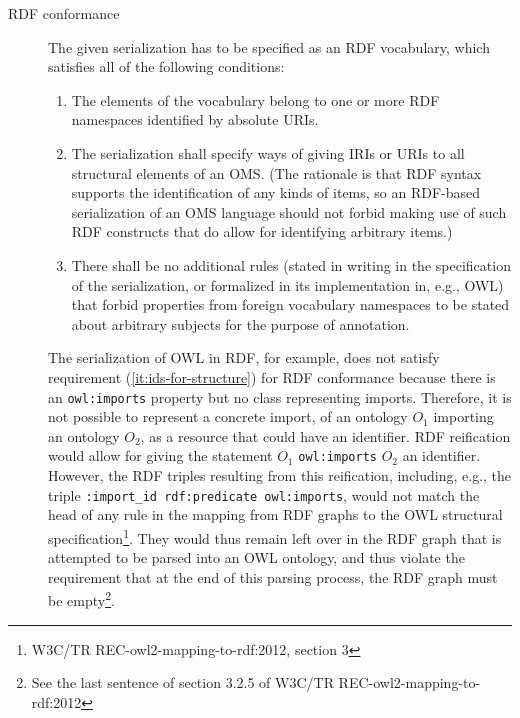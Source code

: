 \documentclass[10pt,fleqn,final]{scrreprt}
\makeatletter
\newcommand{\cbs}[0]{\color{red}\xspace} %
\newcommand{\cbe}[0]{\color{black}\xspace} %
\newcommand*{\eg}{e.g.\@\xspace}
\newcommand*\CommentAuthor{}
\renewcommand*\CommentAuthor{#1}}
\newcommand*\CommentDate{}
\renewcommand*\CommentDate{#1}}
\newcommand*\CommentId{}
\renewcommand*\CommentId{#1}}
\newcommand*\CommentType{}
\renewcommand*\CommentType{#1}}
\newcommand*{\SetCommentColorByType}[1]{%
\edef\localType{{#1}}%
\expandafter\ifstrequal\localType{q-aut}{\colorlet{CommentColor}{red}}{%
\expandafter\ifstrequal\localType{q-all}{\colorlet{CommentColor}{orange}}{%
\expandafter\ifstrequal\localType{todo}{\colorlet{CommentColor}{orange}}{%
\expandafter\ifstrequal\localType{fyi}{\colorlet{CommentColor}{lightgray}}{%
\colorlet{CommentColor}{yellow}}}}}}
\newcommand*{\SetCommentPrefixByType}[1]{%
\edef\localType{{#1}}%
\expandafter\@ifmtarg\localType{%
\edef\CommentPrefix{}%
}{%
\caseupper[q]{#1}%
\edef\CommentPrefix{\thestring: }%
}}
\newcommand*{\initComment}[1]{%
\setkeys{Comment}{#1}%
\SetCommentColorByType{\CommentType}%
\relax%
\SetCommentPrefixByType{\CommentType}%
\relax%
}
\newcommand*{\todonote}[2][]{%
\initComment{#1}%
\pdfcomment[author=\CommentAuthor,color=CommentColor,date=\CommentDate,id=\CommentId]{%
\CommentPrefix
#2}}
\renewcommand*{\todonote}[2][]{%
\initComment{#1}%
\ednote{\CommentPrefix #2}}
\newcommand{\nisref}[1]{#1}
\makeatother
\begin{document}
\begin{description}
\item[RDF conformance]
The given serialization has to be specified as an RDF vocabulary, which
 satisfies all of the following conditions:
\begin{enumerate}
\item The elements of the vocabulary belong to one or more RDF namespaces
 identified by absolute URIs.
\item\label{it:ids-for-structure} The serialization shall specify ways of giving IRIs or URIs to all structural elements of an OMS. (The  rationale is that RDF\cbs syntax supports the identification of\cbe any kinds of items, so an RDF-based serialization of an OMS language should not forbid making use of such RDF constructs that do allow for identifying arbitrary items.)
\item There shall be no additional rules (stated in writing in the specification of the serialization, or formalized in its implementation in, e.g., OWL) that forbid properties from foreign vocabulary namespaces to be stated about arbitrary subjects for the purpose of annotation.
\end{enumerate}

The serialization of OWL in RDF, for example, does not satisfy \cbs{} requirement (\ref{it:ids-for-structure}) for RDF conformance because\cbe{} there is an \texttt{owl:imports} property but no class representing imports. 
 Therefore, it is not possible to represent a concrete import, of an ontology $O_1$ importing an ontology $O_2$, as a resource that could have an identifier.  RDF reification would allow for giving the statement $O_1$ \texttt{owl:imports} $O_2$ an identifier. 
 However, the RDF triples resulting from this reification, including, e.g., the triple \texttt{:import\_id rdf:predicate owl:imports},  would not match the head of any rule in the mapping from RDF graphs to the OWL structural specification\footnote{\nisref{W3C/TR REC-owl2-mapping-to-rdf:2012}, section 3}. 
 They would thus remain left over in the RDF graph that is attempted to be parsed into an OWL ontology, and thus violate the requirement that at the end of this parsing process, the RDF graph must be empty\footnote{See the last sentence of section 3.2.5 of \nisref{W3C/TR REC-owl2-mapping-to-rdf:2012}}.




\end{description}
\end{document}
